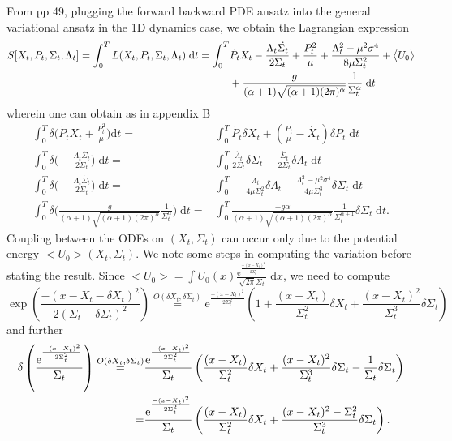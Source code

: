 \documentclass[letterpaper, 12pt]{article}
\newcommand{\rd}{{\mathrm d}}
\newcommand{\re}{{\mathrm e}}
\begin{document}
\indent From pp 49, \cite{Ullmo2017} plugging the forward backward PDE ansatz into the general variational ansatz in the 1D dynamics case, we obtain the Lagrangian expression
\begin{align}
	S[X_t,P_t,\Sigma_t,\Lambda_t] = \int_{0}^{T} L(X_t,P_t,\Sigma_t,\Lambda_t) \; \rd t = \int_{0}^{T}& \dot{P_t}X_t - \frac{\Lambda_t \dot{\Sigma_t}}{2\Sigma_t} + \frac{P_t^2}{\mu} + \frac{\Lambda_t^2 - \mu^2\sigma^4}{8\mu\Sigma_t^2} + \big< U_0 \big> \notag \\
	&+ \frac{g}{(\alpha+1)\sqrt{(\alpha+1)(2\pi)^\alpha}} \frac{1}{\Sigma_t^\alpha} \; \rd t
\end{align}
wherein one can obtain as in appendix B \cite{Ullmo2017}
\begin{align}
	\int_{0}^{T} \delta\Big( \dot{P_t}X_t + \frac{P_t^2}{\mu} \Big) \rd t =& \int_{0}^{T} \dot{P_t}\delta X_t + \left( \frac{P_t}{\mu} - \dot{X_t} \right) \delta P_t \; \rd t \\
	\int_{0}^{T} \delta\Big( - \frac{\Lambda_t \dot{\Sigma_t}}{2\Sigma_t} \Big) \; \rd t =& \int_{0}^{T} \frac{\dot{\Lambda_t}}{2\Sigma_t} \delta \Sigma_t - \frac{\dot{\Sigma_t}}{2\Sigma_t} \delta \Lambda_t \; \rd t \\
	\int_{0}^{T} \delta\Big( - \frac{\Lambda_t \dot{\Sigma_t}}{2\Sigma_t} \Big) \; \rd t =& \int_{0}^{T} - \frac{\Lambda_t}{4\mu\Sigma_t^2} \delta \Lambda_t - \frac{\Lambda_t^2 - \mu^2\sigma^4}{4\mu\Sigma_t^3} \delta \Sigma_t \; \rd t \\
	\int_{0}^{T} \delta\Big( \frac{g}{(\alpha+1)\sqrt{(\alpha+1)(2\pi)^\alpha}} \frac{1}{\Sigma_t^\alpha} \Big) \; \rd t =& \int_{0}^{T} \frac{-g\alpha}{(\alpha+1)\sqrt{(\alpha+1)(2\pi)^\alpha}} \frac{1}{\Sigma_t^{\alpha+1}} \delta \Sigma_t \; \rd t.
\end{align}
Coupling between the ODEs on $(X_t,\Sigma_t)$ can occur only due to the potential energy $\big< U_0 \big>(X_t,\Sigma_t)$. We note some steps in computing the variation before stating the result. Since $\big< U_0 \big> = \int U_0(x)\frac{\re^\frac{-(x-X_t)^2}{2\Sigma_t^2}}{\sqrt{2\pi}\Sigma_t} \;\rd x$, we need to compute
\begin{equation}
	\exp(\frac{-(x-X_t-\delta X_t)^2}{2(\Sigma_t +\delta \Sigma_t)^2}) \overset{O(\delta X_t,\delta\Sigma_t)}{=} \re^\frac{-(x-X_t)^2}{2\Sigma_t^2}  \left( 1 + \frac{(x-X_t)}{\Sigma_t^2} \delta X_t + \frac{(x-X_t)^2}{\Sigma_t^3} \delta \Sigma_t \right)
\end{equation}
and further
\begin{align}
	\delta \left( \frac{\re^\frac{-(x-X_t)^2}{2\Sigma_t^2}}{\Sigma_t} \right) \overset{O(\delta X_t,\delta\Sigma_t)}{=}& \frac{\re^\frac{-(x-X_t)^2}{2\Sigma_t^2}}{\Sigma_t}  \left( \frac{(x-X_t)}{\Sigma_t^2} \delta X_t + \frac{(x-X_t)^2}{\Sigma_t^3} \delta \Sigma_t - \frac{1}{\Sigma_t} \delta \Sigma_t \right) \notag  \\
	=& \frac{\re^\frac{-(x-X_t)^2}{2\Sigma_t^2}}{\Sigma_t}  \left( \frac{(x-X_t)}{\Sigma_t^2} \delta X_t + \frac{(x-X_t)^2 -\Sigma_t^2}{\Sigma_t^3} \delta \Sigma_t \right).
\end{align}
\end{document}

